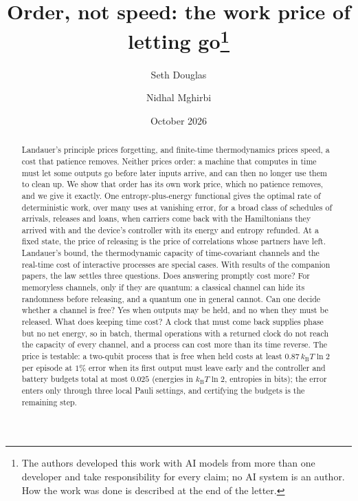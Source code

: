 \documentclass[11pt]{article}
\title{Order, not speed: the work price of letting go\thanks{The authors developed this work with AI models from more than one developer and take responsibility for every claim; no AI system is an author. How the work was done is described at the end of the letter.}}
\author{Seth Douglas \and Nidhal Mghirbi}
\date{October 2026}
\newcommand{\kB}{k_{\mathrm B}}
\begin{document}
\maketitle

\begin{abstract}
Landauer's principle prices forgetting, and finite-time thermodynamics prices speed, a cost that patience removes. Neither prices order: a machine that computes in time must let some outputs go before later inputs arrive, and can then no longer use them to clean up. We show that order has its own work price, which no patience removes, and we give it exactly. One entropy-plus-energy functional gives the optimal rate of deterministic work, over many uses at vanishing error, for a broad class of schedules of arrivals, releases and loans, when carriers come back with the Hamiltonians they arrived with and the device's controller with its energy and entropy refunded. At a fixed state, the price of releasing is the price of correlations whose partners have left. Landauer's bound, the thermodynamic capacity of time-covariant channels and the real-time cost of interactive processes are special cases. With results of the companion papers, the law settles three questions. Does answering promptly cost more? For memoryless channels, only if they are quantum: a classical channel can hide its randomness before releasing, and a quantum one in general cannot. Can one decide whether a channel is free? Yes when outputs may be held, and no when they must be released. What does keeping time cost? A clock that must come back supplies phase but no net energy, so in batch, thermal operations with a returned clock do not reach the capacity of every channel, and a process can cost more than its time reverse. The price is testable: a two-qubit process that is free when held costs at least $0.87\,\kB T\ln2$ per episode at $1\%$ error when its first output must leave early and the controller and battery budgets total at most $0.025$ (energies in $\kB T\ln2$, entropies in bits); the error enters only through three local Pauli settings, and certifying the budgets is the remaining step.
\end{abstract}
\end{document}

